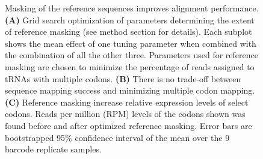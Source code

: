 \documentclass[9pt,lineno]{elife}
\begin{document}
\begin{figure}[ht!]
\centering
{}
\caption{
Masking of the reference sequences improves alignment performance.
\textbf{(A)} Grid search optimization of parameters determining the extent of reference masking (see method section for details).
Each subplot shows the mean effect of one tuning parameter when combined with the combination of all the other three.
Parameters used for reference masking are chosen to minimize the percentage of reads assigned to tRNAs with multiple codons.
\textbf{(B)} There is no trade-off between sequence mapping success and minimizing multiple codon mapping.
\textbf{(C)} Reference masking increase relative expression levels of select codons.
Reads per million (RPM) levels of the codons shown was found before and after optimized reference masking.
Error bars are bootstrapped 95\% confidence interval of the mean over the 9  barcode replicate samples.
}
\label{fig:Fig3}

\label{figsupp:f3S1}


\end{figure}
\end{document}
